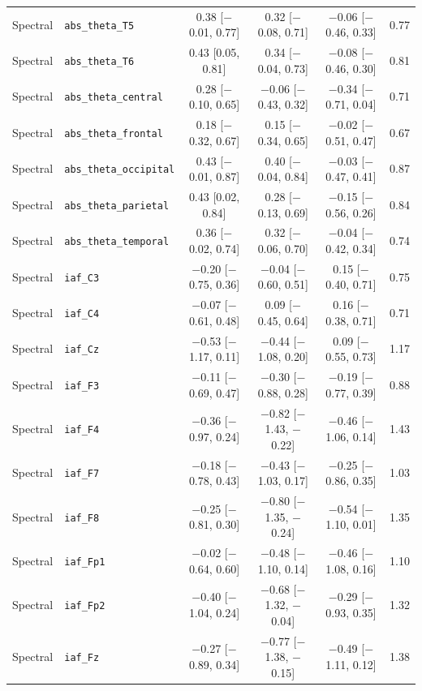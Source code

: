 {\begin{longtable}{llcccc}
Spectral & \texttt{abs\_theta\_T5} & 0.38 [$-$0.01, 0.77] & 0.32 [$-$0.08, 0.71] & $-$0.06 [$-$0.46, 0.33] & 0.77 \\
Spectral & \texttt{abs\_theta\_T6} & 0.43 [0.05, 0.81] & 0.34 [$-$0.04, 0.73] & $-$0.08 [$-$0.46, 0.30] & 0.81 \\
Spectral & \texttt{abs\_theta\_central} & 0.28 [$-$0.10, 0.65] & $-$0.06 [$-$0.43, 0.32] & $-$0.34 [$-$0.71, 0.04] & 0.71 \\
Spectral & \texttt{abs\_theta\_frontal} & 0.18 [$-$0.32, 0.67] & 0.15 [$-$0.34, 0.65] & $-$0.02 [$-$0.51, 0.47] & 0.67 \\
Spectral & \texttt{abs\_theta\_occipital} & 0.43 [$-$0.01, 0.87] & 0.40 [$-$0.04, 0.84] & $-$0.03 [$-$0.47, 0.41] & 0.87 \\
Spectral & \texttt{abs\_theta\_parietal} & 0.43 [0.02, 0.84] & 0.28 [$-$0.13, 0.69] & $-$0.15 [$-$0.56, 0.26] & 0.84 \\
Spectral & \texttt{abs\_theta\_temporal} & 0.36 [$-$0.02, 0.74] & 0.32 [$-$0.06, 0.70] & $-$0.04 [$-$0.42, 0.34] & 0.74 \\
Spectral & \texttt{iaf\_C3} & $-$0.20 [$-$0.75, 0.36] & $-$0.04 [$-$0.60, 0.51] & 0.15 [$-$0.40, 0.71] & 0.75 \\
Spectral & \texttt{iaf\_C4} & $-$0.07 [$-$0.61, 0.48] & 0.09 [$-$0.45, 0.64] & 0.16 [$-$0.38, 0.71] & 0.71 \\
Spectral & \texttt{iaf\_Cz} & $-$0.53 [$-$1.17, 0.11] & $-$0.44 [$-$1.08, 0.20] & 0.09 [$-$0.55, 0.73] & 1.17 \\
Spectral & \texttt{iaf\_F3} & $-$0.11 [$-$0.69, 0.47] & $-$0.30 [$-$0.88, 0.28] & $-$0.19 [$-$0.77, 0.39] & 0.88 \\
Spectral & \texttt{iaf\_F4} & $-$0.36 [$-$0.97, 0.24] & $-$0.82 [$-$1.43, $-$0.22] & $-$0.46 [$-$1.06, 0.14] & 1.43 \\
Spectral & \texttt{iaf\_F7} & $-$0.18 [$-$0.78, 0.43] & $-$0.43 [$-$1.03, 0.17] & $-$0.25 [$-$0.86, 0.35] & 1.03 \\
Spectral & \texttt{iaf\_F8} & $-$0.25 [$-$0.81, 0.30] & $-$0.80 [$-$1.35, $-$0.24] & $-$0.54 [$-$1.10, 0.01] & 1.35 \\
Spectral & \texttt{iaf\_Fp1} & $-$0.02 [$-$0.64, 0.60] & $-$0.48 [$-$1.10, 0.14] & $-$0.46 [$-$1.08, 0.16] & 1.10 \\
Spectral & \texttt{iaf\_Fp2} & $-$0.40 [$-$1.04, 0.24] & $-$0.68 [$-$1.32, $-$0.04] & $-$0.29 [$-$0.93, 0.35] & 1.32 \\
Spectral & \texttt{iaf\_Fz} & $-$0.27 [$-$0.89, 0.34] & $-$0.77 [$-$1.38, $-$0.15] & $-$0.49 [$-$1.11, 0.12] & 1.38 \\

\end{longtable}}
